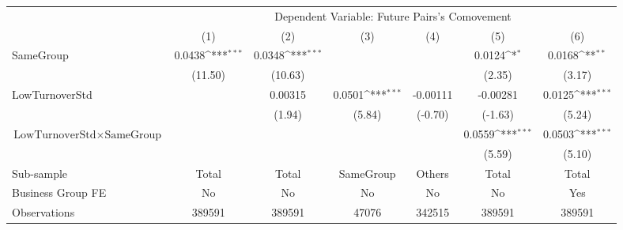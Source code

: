 {
\def\sym#1{\ifmmode^{#1}\else\(^{#1}\)\fi}
\begin{tabular}{l*{6}{c}}
\hline\hline
                &\multicolumn{6}{c}{Dependent Variable:  Future Pairs's Comovement}                                               \\\cmidrule(lr){2-7}
                &\multicolumn{1}{c}{(1)}         &\multicolumn{1}{c}{(2)}         &\multicolumn{1}{c}{(3)}         &\multicolumn{1}{c}{(4)}         &\multicolumn{1}{c}{(5)}         &\multicolumn{1}{c}{(6)}         \\
\hline
SameGroup       &   0.0438\sym{***}&   0.0348\sym{***}&                  &                  &   0.0124\sym{*}  &   0.0168\sym{**} \\
                &  (11.50)         &  (10.63)         &                  &                  &   (2.35)         &   (3.17)         \\
[1em]
LowTurnoverStd  &                  &  0.00315         &   0.0501\sym{***}& -0.00111         & -0.00281         &   0.0125\sym{***}\\
                &                  &   (1.94)         &   (5.84)         &  (-0.70)         &  (-1.63)         &   (5.24)         \\
[1em]
$ {\text{LowTurnoverStd} } \times {\text{SameGroup} }  $ &                  &                  &                  &                  &   0.0559\sym{***}&   0.0503\sym{***}\\
                &                  &                  &                  &                  &   (5.59)         &   (5.10)         \\
\hline
Sub-sample      &    Total         &    Total         &SameGroup         &   Others         &    Total         &    Total         \\
Business Group FE&       No         &       No         &       No         &       No         &       No         &      Yes         \\
Observations    &   389591         &   389591         &    47076         &   342515         &   389591         &   389591         \\
\hline\hline  \end{tabular}}
